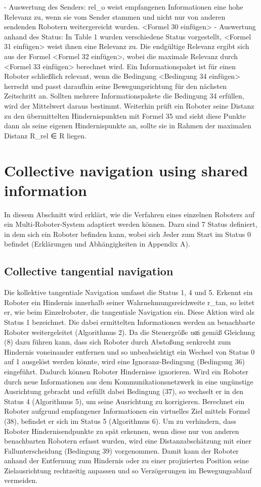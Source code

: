 \documentclass[conference]{IEEEtran}
\begin{document}
-	Auswertung des Senders: rel_o weist empfangenen Informationen eine hohe Relevanz zu, wenn sie vom Sender stammen und nicht nur von anderen sendenden Robotern weitergereicht wurden. <Formel 30 einfügen>
-	Auswertung anhand des Status: In Table 1 wurden verschiedene Status vorgestellt, <Formel 31 einfügen> weist ihnen eine Relevanz zu.
Die endgültige Relevanz ergibt sich aus der Formel <Formel 32 einfügen>, wobei die maximale Relevanz durch <Formel 33 einfügen> berechnet wird. Ein Informationspaket ist für einen Roboter schließlich relevant, wenn die Bedingung <Bedingung 34 einfügen> herrscht und passt daraufhin seine Bewegungsrichtung für den nächsten Zeitschritt an. Sollten mehrere Informationspakete die Bedingung 34 erfüllen, wird der Mittelwert daraus bestimmt.
Weiterhin prüft ein Roboter seine Distanz zu den übermittelten Hindernispunkten mit Formel 35 und sieht diese Punkte dann als seine eigenen Hindernispunkte an, sollte sie in Rahmen der maximalen Distanz R_rel ∈ R liegen.


\section{Collective navigation using shared information}
In diesem Abschnitt wird erklärt, wie die Verfahren eines einzelnen Roboters auf ein Multi-Roboter-System adaptiert werden können. Dazu sind 7 Status definiert, in dem sich ein Roboter befinden kann, wobei sich Jeder zum Start im Status 0 befindet (Erklärungen und Abhängigkeiten in Appendix A).


\subsection{Collective tangential navigation}
Die kollektive tangentiale Navigation umfasst die Status 1, 4 und 5. Erkennt ein Roboter ein Hindernis innerhalb seiner Wahrnehmungsreichweite r_tan, so leitet er, wie beim Einzelroboter, die tangentiale Navigation ein. Diese Aktion wird als Status 1 bezeichnet. Die dabei ermittelten Informationen werden an benachbarte Roboter weitergeleitet (Algorithmus 2).
Da die Steuergröße uαi gemäß Gleichung (8) dazu führen kann, dass sich Roboter durch Abstoßung senkrecht zum Hindernis voneinander entfernen und so unbeabsichtigt ein Wechsel von Status 0 auf 1 ausgelöst werden könnte, wird eine Ignoranz-Bedingung (Bedingung 36) eingeführt. Dadurch können Roboter Hindernisse ignorieren.
Wird ein Roboter durch neue Informationen aus dem Kommunikationsnetzwerk in eine ungünstige Ausrichtung gebracht und erfüllt dabei Bedingung (37), so wechselt er in den Status 4 (Algorithmus 5), um seine Ausrichtung zu korrigieren.
Berechnet ein Roboter aufgrund empfangener Informationen ein virtuelles Ziel mittels Formel (38), befindet er sich im Status 5 (Algorithmus 6).
Um zu verhindern, dass Roboter Hindernisendpunkte zu spät erkennen, wenn diese nur von anderen benachbarten Robotern erfasst wurden, wird eine Distanzabschätzung mit einer Fallunterscheidung (Bedingung 39) vorgenommen. Damit kann der Roboter anhand der Entfernung zum Hindernis oder zu einer projizierten Position seine Zielausrichtung rechtzeitig anpassen und so Verzögerungen im Bewegungsablauf vermeiden.
\end{document}
